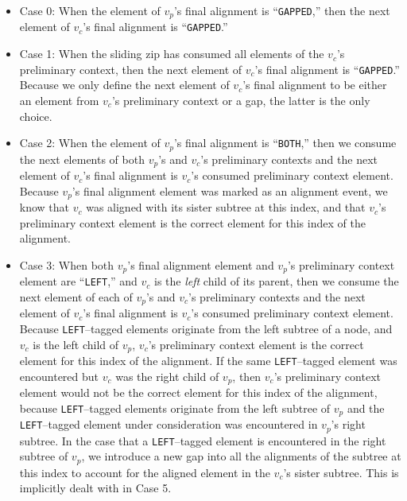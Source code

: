 \documentclass{bmcart}
\begin{document}
\begin{itemize}

  \item Case 0: When the element of $v_p$'s final alignment is ``\texttt{GAPPED},'' then the next element of $v_c$'s final alignment is ``\texttt{GAPPED}.''

  \item Case 1: When the sliding zip has consumed all elements of the $v_c$'s preliminary context, then the next element of $v_c$'s final alignment is ``\texttt{GAPPED}.''
  Because we only define the next element of $v_c$'s final alignment to be either an element from $v_c$'s preliminary context or a gap, the latter is the only choice.

  \item Case 2: When the element of $v_p$'s final alignment is ``\texttt{BOTH},'' then we consume the next elements of both $v_p$'s and $v_c$'s preliminary contexts and the next element of $v_c$'s final alignment is $v_c$'s consumed preliminary context element.
  Because $v_p$'s final alignment element was marked as an alignment event, we know that $v_c$ was aligned with its sister subtree at this index, and that $v_c$'s preliminary context element is the correct element for this index of the alignment.
  
  \item Case 3: When both $v_p$'s final alignment element and $v_p$'s preliminary context element are ``\texttt{LEFT},'' and $v_c$ is the \textit{left} child of its parent, then we consume the next element of each of $v_p$'s and $v_c$'s preliminary contexts and the next element of $v_c$'s final alignment is $v_c$'s consumed preliminary context element.
  Because \texttt{LEFT}--tagged elements originate from the left subtree of a node, and $v_c$ is the left child of $v_p$, $v_c$'s preliminary context element is the correct element for this index of the alignment.
  If the same \texttt{LEFT}--tagged element was encountered but $v_c$ was the right child of $v_p$, then $v_c$'s preliminary context element would not be the correct element for this index of the alignment, because \texttt{LEFT}--tagged elements originate from the left subtree of $v_p$ and the \texttt{LEFT}--tagged element under consideration was encountered in $v_p$'s right subtree.
  In the case that a \texttt{LEFT}--tagged element is encountered in the right subtree of $v_p$, we introduce a new gap into all the alignments of the subtree at this index to account for the aligned element in the $v_c$'s sister subtree.
  This is implicitly dealt with in Case 5.
  

\end{itemize}
\end{document}
